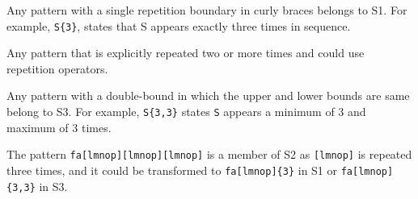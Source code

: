 \begin{description}  \itemsep -1pt
\item[S1:] Any pattern with a single repetition boundary in curly braces belongs to S1. For example,   \verb!S{3}!, states that S appears exactly three times in sequence.
\item[S2:] Any pattern that is explicitly repeated two or more times and could use repetition operators. 
\item[S3:] Any pattern with a double-bound in which the upper and lower bounds are same belong to S3. For example, \verb!S{3,3}! states \verb!S! appears a minimum of 3 and maximum of 3 times.
\end{description}

The pattern \verb!fa[lmnop][lmnop][lmnop]! is a member of S2 as \verb![lmnop]! is repeated three times, and it could be transformed to \verb!fa[lmnop]{3}! in S1 or \verb!fa[lmnop]{3,3}! in S3.





